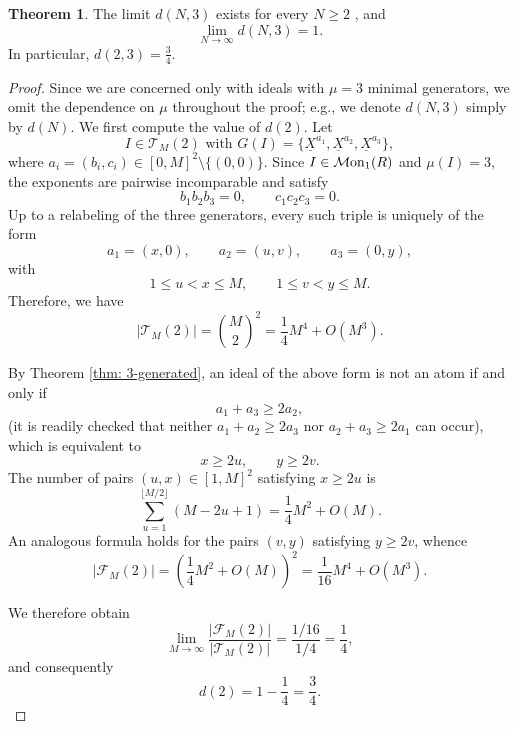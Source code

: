 \documentclass[a4paper,10pt,reqno]{amsart}
\theoremstyle{definition}
\newtheorem{theorem}{Theorem}[section]
\theoremstyle{definition}
\providecommand\Mon{{\mathcal{M}{\rm on}}}
\begin{document}
\begin{theorem}\label{thm: d3}
    The limit $d(N,3)$ exists for every $N\ge 2$ , and
    \[ \lim_{N\to\infty} d(N,3) = 1.\]
    In particular, $d(2,3)=\frac34$.
\end{theorem}
\begin{proof}
Since we are concerned only with ideals with $\mu=3$ minimal generators, we omit the dependence on $\mu$ throughout the proof; e.g., we denote $d(N,3)$ simply by $d(N)$. We first compute the value of $d(2)$. Let
\[ I\in \mathcal T_M(2)\text{ with } G(I)=\{\underline X^{a_1},\underline X^{a_2},\underline X^{a_3}\},\]
where $a_i=(b_i,c_i)\in[0,M]^2\setminus\{(0,0)\}$. Since $I\in\Mon_1(R)$ and $\mu(I)=3$, the exponents are pairwise incomparable and satisfy
\[ b_1b_2b_3=0,\qquad c_1c_2c_3=0.\]
Up to a relabeling of the three generators, every such triple is uniquely of the form
\[ a_1=(x,0),\qquad a_2=(u,v),\qquad a_3=(0,y),\]
with
\[ 1\le u<x\le M,\qquad 1\le v<y\le M.\]
Therefore, we have
\[ |\mathcal T_M(2)|=\binom{M}{2}^2=\frac14M^4 + O(M^3).\]

By Theorem \ref{thm: 3-generated}, an ideal of the above form is not an atom if and only if
\[ a_1+a_3\ge 2a_2, \]
(it is readily checked that neither $a_1+a_2\ge 2a_3$ nor $a_2+a_3\ge 2a_1$ can occur), which is equivalent to
\[ x\ge 2u,\qquad y\ge 2v.\]
The number of pairs $(u,x)\in [1,M]^2$ satisfying $x\ge 2u$ is
\[\sum_{u=1}^{\lfloor M/2\rfloor}(M-2u+1) = \frac14M^2+O(M).\]
An analogous formula holds for the pairs $(v,y)$ satisfying $y\ge 2v$, whence 
\[ |\mathcal F_M(2)| = \left(\frac14M^2+O(M)\right)^2 = \frac1{16}M^4+O(M^3).\]

We therefore obtain
\[ \lim_{M\to\infty} \frac{|\mathcal F_M(2)|}{|\mathcal T_M(2)|} = \frac{1/16}{1/4} = \frac14, \]
and consequently
\[ d(2)=1-\frac14=\frac34.\]


\end{proof}
\end{document}

